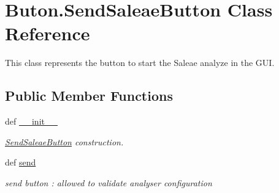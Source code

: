 \hypertarget{classButon_1_1SendSaleaeButton}{\section{Buton.\+Send\+Saleae\+Button Class Reference}
\label{classButon_1_1SendSaleaeButton}
}


This class represents the button to start the Saleae analyze in the G\+U\+I.  


\subsection*{Public Member Functions}
\begin{DoxyCompactItemize}
\item 
def \hyperlink{classButon_1_1SendSaleaeButton_ad597987752f13271716e1b74c6f7fb74}{\+\_\+\+\_\+init\+\_\+\+\_\+}
\begin{DoxyCompactList}\small\item\em \hyperlink{classButon_1_1SendSaleaeButton}{Send\+Saleae\+Button} construction. \end{DoxyCompactList}\item 
\hypertarget{classButon_1_1SendSaleaeButton_a3839533414ef3ca3a7e81395dd923c37}{def \hyperlink{classButon_1_1SendSaleaeButton_a3839533414ef3ca3a7e81395dd923c37}{send}}\label{classButon_1_1SendSaleaeButton_a3839533414ef3ca3a7e81395dd923c37}

\begin{DoxyCompactList}\small\item\em send button \+: allowed to validate analyser configuration \end{DoxyCompactList}\end{DoxyCompactItemize}
